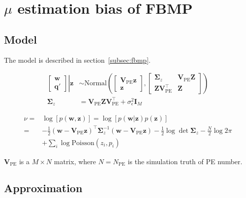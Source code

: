 \appendix
\section{$\mu$ estimation bias of FBMP}
\label{sec:mubias}

\subsection{Model}

The model is described in section~\ref{subsec:fbmp}. 

\begin{equation}
\begin{aligned}
    \left.
    \begin{bmatrix}
        \bm{w} \\
        \bm{q}'
    \end{bmatrix}
    \right\vert\bm{z}
    &\sim \mathrm{Normal}\left(
    \begin{bmatrix}
        \bm{V}_\mathrm{PE}\bm{z} \\
        \bm{z}
    \end{bmatrix}, 
    \begin{bmatrix}
        \bm{\Sigma}_z & \bm{V}_\mathrm{PE}\bm{Z} \\
        \bm{Z}\bm{V}_\mathrm{PE}^\intercal & \bm{Z}
    \end{bmatrix}
    \right) \\
    \bm{\Sigma}_z &= \bm{V}_\mathrm{PE}\bm{Z}\bm{V}_\mathrm{PE}^\intercal+\sigma_\epsilon^2\bm{I}_M 
\end{aligned}
\end{equation}

\begin{equation}
\begin{aligned}
    \nu =& \log[p(\bm{w},\bm{z})] = \log[p(\bm{w}|\bm{z})p(\bm{z})] \\
    =& -\frac{1}{2}(\bm{w}-\bm{V}_\mathrm{PE}\bm{z})^\intercal\bm{\Sigma}_z^{-1}(\bm{w}-\bm{V}_\mathrm{PE}\bm{z})-\frac{1}{2}\log\det\bm{\Sigma}_z-\frac{N}{2}\log2\pi \\
    &+ \sum_{i}\log{\mathrm{Poisson}(z_i,p_i)}
\end{aligned}
\end{equation}

$\bm{V}_\mathrm{PE}$ is a $M\times N$ matrix, where $N=N_\mathrm{PE}$ is the simulation truth of PE number. 

\subsection{Approximation}

